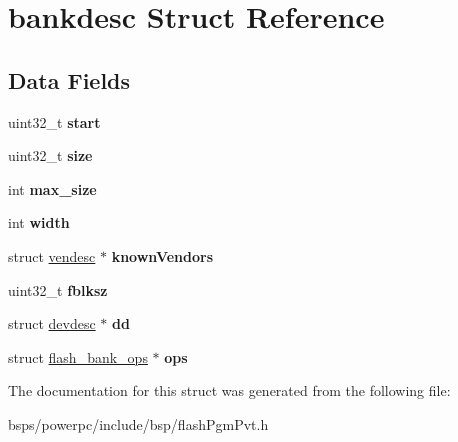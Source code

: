 \hypertarget{structbankdesc}{}\section{bankdesc Struct Reference}
\label{structbankdesc}
\subsection*{Data Fields}
\begin{DoxyCompactItemize}
\item 
\mbox{\label{structbankdesc_affbfe6cb8d5038c45c511ca94429ee48}} 
uint32\+\_\+t {\bfseries start}
\item 
\mbox{\label{structbankdesc_aaf3147a6ff4fefe6106a972348224742}} 
uint32\+\_\+t {\bfseries size}
\item 
\mbox{\label{structbankdesc_aba6985cf1bb0616787ce12b401a40c7c}} 
int {\bfseries max\+\_\+size}
\item 
\mbox{\label{structbankdesc_a30bdd96cf160af24dbce11a30dd62e64}} 
int {\bfseries width}
\item 
\mbox{\label{structbankdesc_ab43c989e5d8a959c07ca315ac81f5ccd}} 
struct \mbox{\hyperlink{structvendesc}{vendesc}} $\ast$ {\bfseries known\+Vendors}
\item 
\mbox{\label{structbankdesc_aefd4bc098ba5a004415a93cd1f725f77}} 
uint32\+\_\+t {\bfseries fblksz}
\item 
\mbox{\label{structbankdesc_aacbedb5b9683025e93ddd69fe71ac523}} 
struct \mbox{\hyperlink{structdevdesc}{devdesc}} $\ast$ {\bfseries dd}
\item 
\mbox{\label{structbankdesc_a9f2b867a6569c2834b3f4c1532277c53}} 
struct \mbox{\hyperlink{structflash__bank__ops}{flash\+\_\+bank\+\_\+ops}} $\ast$ {\bfseries ops}
\end{DoxyCompactItemize}


The documentation for this struct was generated from the following file\+:\begin{DoxyCompactItemize}
\item 
bsps/powerpc/include/bsp/flash\+Pgm\+Pvt.\+h\end{DoxyCompactItemize}

